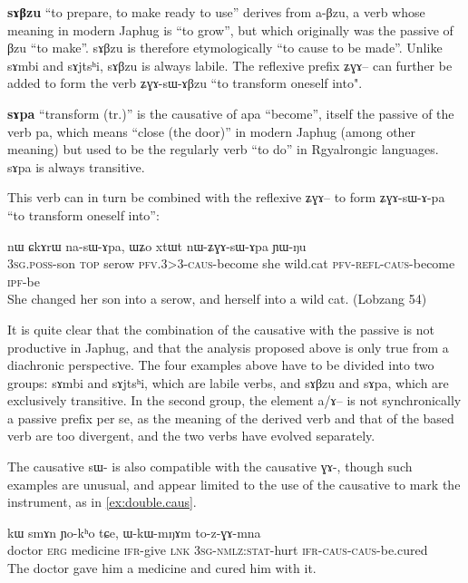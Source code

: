 \documentclass[oldfontcommands,oneside,a4paper,11pt]{article}
\newcommand{\ipa}[1]{{\phon \mbox{#1}}} %
\newcommand{\sg}{\textsc{sg}}
\newcommand{\wav}[1]{}%
\newcommand{\pfv}{\textsc{pfv}}
\newcommand{\caus}{\textsc{caus}}
\newcommand{\lnk}{\textsc{lnk}}
\newcommand{\erg}{\textsc{erg}}
\newcommand{\evd}{\textsc{ifr}}
\newcommand{\ipf}{\textsc{ipf}}
\newcommand{\nmlz}{\textsc{nmlz}}
\newcommand{\poss}{\textsc{poss}}
\newcommand{\refl}{\textsc{refl}}
\newcommand{\stat}{\textsc{stat}}
\newcommand{\topic}{\textsc{top}}
\begin{document}
  
  \textbf{\ipa{sɤβzu}} ``to prepare, to make ready to use'' derives from \ipa{a-βzu}, a verb whose meaning in modern Japhug is ``to grow'', but which originally was the passive of \ipa{βzu} ``to make''. \ipa{sɤβzu}  is therefore etymologically ``to cause to be made''. Unlike   \ipa{sɤmbi} and \ipa{sɤjtsʰi}, \ipa{sɤβzu} is always labile. The reflexive prefix \ipa{ʑɣɤ}-- can further be added to form the verb \ipa{ʑɣɤ-sɯ-ɤβzu} ``to transform oneself into".

  \textbf{\ipa{sɤpa}} ``transform (tr.)'' is the causative of \ipa{apa} ``become'', itself the passive of the verb \ipa{pa}, which means ``close (the door)'' in modern Japhug (among other meaning) but used to be the  regularly verb ``to do'' in Rgyalrongic languages. \ipa{sɤpa} is always transitive.
  
  This verb can in turn be combined with the reflexive \ipa{ʑɣɤ}-- to form \ipa{ʑɣɤ-sɯ-ɤ-pa} ``to transform oneself into'':
  
  \begin{exe}
\ex
\gll \ipa{ɯ-tɕɯ} 	\ipa{nɯ} 	\ipa{ɕkɤrɯ} 	\ipa{na-sɯ-ɤpa,} 	\ipa{ɯʑo} 	\ipa{xtɯt} 	\ipa{nɯ-ʑɣɤ-sɯ-ɤpa} 	\ipa{ɲɯ-ŋu} \\
3\sg{}.\poss{}-son \topic{} serow \pfv{}.3>3-\caus{}-become she wild.cat \pfv{}-\refl{}-\caus{}-become \ipf{}-be\\
 \glt She changed her son into a serow, and herself into a wild cat.  (Lobzang 54)
\end{exe} 


It is quite clear that the combination of the causative with the passive is not productive in Japhug, and that the analysis proposed above is only true from a diachronic perspective. The four examples above have to be divided into two groups:   \ipa{sɤmbi} and \ipa{sɤjtsʰi}, which are labile verbs, and \ipa{sɤβzu} and \ipa{sɤpa}, which are exclusively transitive. In the second group,  the element \ipa{a/ɤ}-- is not synchronically a passive prefix per se, as the meaning of the derived verb and that of the based verb are too divergent, and the two verbs have evolved separately.


The causative \ipa{sɯ-} is also compatible with the causative \ipa{ɣɤ-}, though such examples are unusual, and appear limited to the use of  the causative to mark the instrument, as in \ref{ex:double.caus}.
 \begin{exe}
\ex  \label{ex:double.caus}
\gll \ipa{smɤnba} 	\ipa{kɯ} 	\ipa{smɤn} 	\ipa{ɲo-kʰo} 	\ipa{tɕe,} 	\ipa{ɯ-kɯ-mŋɤm} 	\ipa{to-z-ɣɤ-mna}    \\
  doctor \erg{} medicine \evd{}-give \lnk{} 3\sg{}-\nmlz{}:\stat{}-hurt \evd{}-\caus{}-\caus{}-be.cured \\
\glt The doctor gave him a medicine and cured him with it. \wav{8_zGAmna}
\end{exe}
 
\end{document}
